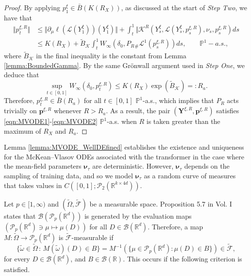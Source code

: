 \documentclass{article}
\newcommand{\R}{\mathbb{R}}
\begin{document}
\begin{appendices}
\begin{proof}
By applying $p_1^\xi\in \bar B(K(R_X))$, as discussed at the start of \textit{Step Two}, we have that
 \begin{align*}
      \Vert p_t^{\xi,R} \Vert &\le \Vert \partial_\mu\ell(\mathcal L(Y^\xi_1))(Y^\xi_1)\Vert + \int^1_t \Vert \mathcal K^R(Y^\xi_s,\mathcal L(Y^\xi_s,p^{\xi,R}_s),\nu_s, p_s^{\xi,R})ds \\& \le K(R_X)+\tilde{B}_\mathcal{K}\int_t^1 W_\infty(\delta_0,P_{R}{}_\#\mathcal L^1(p^{\xi,R}_s))ds, \qquad\mathbb P^1-a.s.,
 \end{align*}
where $\tilde{B}_\mathcal K$ in the final inequality is the constant from Lemma \ref{lemma:BoundedGamma}. By the same Gr\"onwall argument used in \textit{Step One}, we deduce that
\[
\sup_{t\in[0,1]}W_\infty(\delta_0,p^{\xi,R}_t)\le K(R_X)\exp(\tilde{B}_\mathcal{K})=:R_a.
\]
Therefore, $p^{\xi,R}_t\in \bar B(R_a)$ for all $t\in[0,1]$ $\mathbb  P^1$-a.s., which implies that $P_R$ acts trivially on $\bm{p}^{\xi,R}$ whenever $R>R_a$. As a result, the pair $(\bm{Y}^{\xi,R},\bm{p}^{\xi,R})$ satisfies \eqref{eqn:MVODE1}-\eqref{eqn:MVODE2} $\mathbb P^1$-a.s. when $R$ is taken greater than the maximum of $R_X$ and $R_a$. 
\end{proof}
 Lemma \ref{lemma:MVODE_WellDEfined} establishes the existence and uniqueness for the McKean--Vlasov ODEs associated with the transformer in the case where the mean-field parameters $\bm{\nu}_\tau$ are deterministic. However, $\bm{\nu}_\tau$ depends on the sampling of training data, and so we model $\bm{\nu}_\tau$ as a random curve of measures that takes values in $C([0,1]; \mathcal P_2(\R^{k\times 4d}))$.
    
    Let $p\in[1,\infty)$ and $(\widetilde{\Omega},\widetilde{\mathcal F})$ be a measurable space. Proposition 5.7 in \cite{carmona2018probabilistic} Vol. I states that $\mathcal B(\mathcal P_p(\R^d))$ is generated by the evaluation maps $(\mathcal P_p(\R^d)\ni \mu \mapsto \mu(D))$ for all $D\in \mathcal B(\R^d)$.  Therefore, a map $M:\widetilde{\Omega}\to \mathcal P_p(\R^d)$ is $\widetilde{\mathcal F}$-measurable if
    \[
    \{\tilde{\omega}\in \tilde{\Omega}\,\colon\,M(\tilde{\omega})(D)\in B \}=M^{-1}(\{\mu\in \mathcal P_p(\R^d)\colon \mu(D)\in B\})\in \widetilde{\mathcal F},
    \]
 for every $D\in \mathcal B(\R^d)$, and $B\in \mathcal B(\R)$. This occurs if the following criterion is satisfied.
    

\end{appendices}
\end{document}
